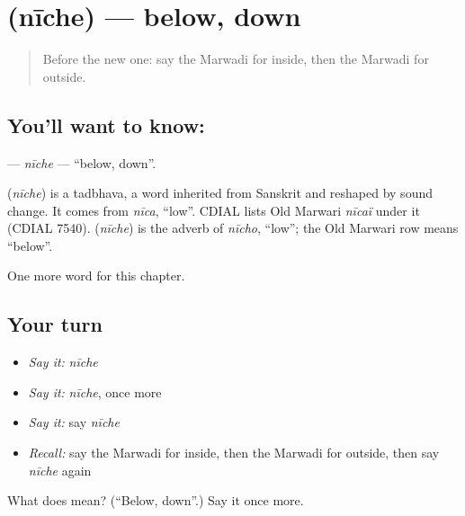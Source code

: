 \section[\texorpdfstring{\mw{नीचे} (nīche)}{नीचे (nīche)}]{ (nīche) — below, down}

\label{lesson:MW-C81-niche}



\begin{quote}
Before the new one: say the Marwadi for inside, then the Marwadi for outside.
\end{quote}

\subsection*{You'll want to know: }
\textbf{} — \emph{nīche} — \textquotedblleft{}below, down\textquotedblright{}.

\begin{cousinweb}
\textbf{} (\emph{nīche}) is a tadbhava, a word inherited from Sanskrit and reshaped by sound change. It comes from \emph{nīca}, \textquotedblleft{}low\textquotedblright{}. CDIAL lists Old Marwari \emph{nīcaï} under it (CDIAL 7540). \textbf{} (\emph{nīche}) is the adverb of \emph{nīcho}, \textquotedblleft{}low\textquotedblright{}; the Old Marwari row means \textquotedblleft{}below\textquotedblright{}.
\end{cousinweb}

\begin{grammarlens}[title={What you've built}]
One more word for this chapter.
\end{grammarlens}

\subsection*{Your turn}
\begin{itemize}
\raggedright
  \item \emph{Say it:} \emph{nīche}
  \item \emph{Say it:} \emph{nīche}, once more
  \item \emph{Say it:} say \emph{nīche}
  \item \emph{Recall:} say the Marwadi for inside, then the Marwadi for outside, then say \emph{nīche} again
\end{itemize}

\begin{tcolorbox}[breakable,colback=teal!4,colframe=teal!35!black,title={Before you move on}]
What does  mean? (\textquotedblleft{}Below, down\textquotedblright{}.) Say it once more.
\end{tcolorbox}
